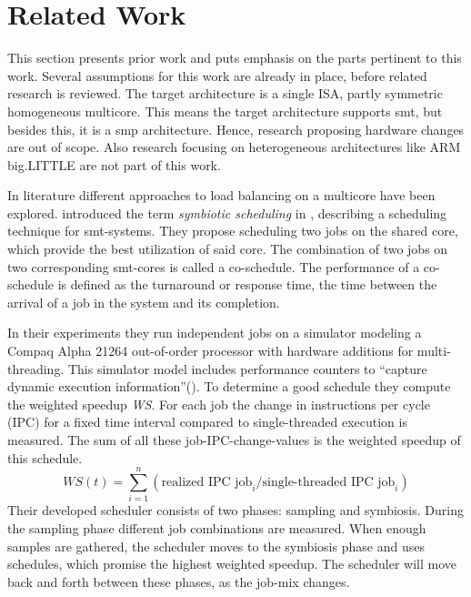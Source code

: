 \section{Related Work}
\label{state:related}

This section presents prior work and puts emphasis on the parts pertinent to
this work.
Several assumptions for this work are already in place, before related research
is reviewed.
The target architecture is a single ISA, partly symmetric homogeneous
multicore.
This means the target architecture supports \gls{smt}, but besides this, it is
a \gls{smp} architecture.
Hence, research proposing hardware changes are out of scope.
Also research focusing on heterogeneous architectures like ARM big.LITTLE are
not part of this work.


\begin{comment}
  Structure for the description of related work:
    * Assumptions
    * Concept
    * Relevant contribution
    * Result
    * Deficits

  Alternative: Aspects of the thesis in related work;
\end{comment}

In literature different approaches to load balancing on a multicore have been
explored.
\citeauthor{snavely_symbiotic_2000} introduced the term \emph{symbiotic
scheduling} in \cite{snavely_symbiotic_2000}, describing a scheduling technique
for \gls{smt}-systems.
They propose scheduling two jobs on the shared core, which provide the best
utilization of said core.
The combination of two jobs on two corresponding \gls{smt}-cores is called a
co-schedule.
The performance of a co-schedule is defined as the turnaround or response time,
the time between the arrival of a job in the system and its completion.

In their experiments they run independent jobs on a simulator modeling a Compaq
Alpha 21264 out-of-order processor with hardware additions for multi-threading.
This simulator model includes performance counters to ``capture dynamic execution
information''(\autocite[236]{snavely_symbiotic_2000}).
To determine a good schedule they compute the weighted speedup \textit{WS}.
For each job the change in instructions per cycle (IPC) for a fixed time
interval compared to single-threaded execution is measured.
The sum of all these job-IPC-change-values is the weighted speedup of this
schedule.
$$ WS(t) = \sum_{i=1}^n (\text{realized IPC job}_i / \text{single-threaded IPC
job}_i)$$
Their developed scheduler consists of two phases: sampling and symbiosis.
During the sampling phase different job combinations are measured.
When enough samples are gathered, the scheduler moves to the symbiosis phase
and uses schedules, which promise the highest weighted speedup.
The scheduler will move back and forth between these phases, as the job-mix
changes.

